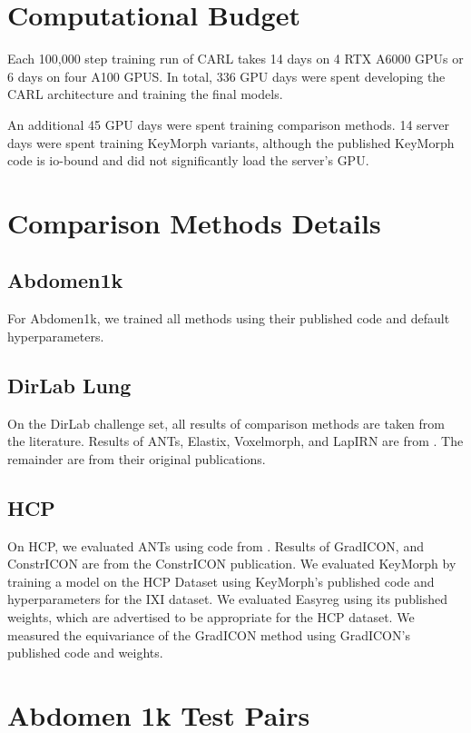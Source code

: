 \section{Computational Budget}

Each 100,000 step training run of CARL takes 14 days on 4 RTX A6000 GPUs or 6 days on four A100 GPUS. In total, 336 GPU days were spent developing the CARL architecture and training the final models.

An additional 45 GPU days were spent training comparison methods. 14 server days were spent training KeyMorph variants, although the published KeyMorph code is io-bound and did not significantly load the server's GPU.

\section{Comparison Methods Details}

\subsection{Abdomen1k}
For Abdomen1k, we trained all methods using their published code and default hyperparameters.

\subsection{DirLab Lung}
On the DirLab challenge set, all results of comparison methods are taken from the literature. Results of ANTs, Elastix, Voxelmorph, and LapIRN are from \cite{tian2022}. The remainder are from their original publications.

\subsection{HCP}
On HCP, we evaluated ANTs using code from \cite{tian2022}. Results of GradICON, and ConstrICON are from the ConstrICON publication. We evaluated KeyMorph by training a model on the HCP 
Dataset using KeyMorph's published code and hyperparameters for the IXI dataset. We evaluated Easyreg using its published weights, which are advertised to be appropriate for the HCP dataset. We measured the equivariance of the GradICON method using GradICON's published code and weights.



\section{Abdomen 1k Test Pairs}
\label{abdomen_fulldata}

